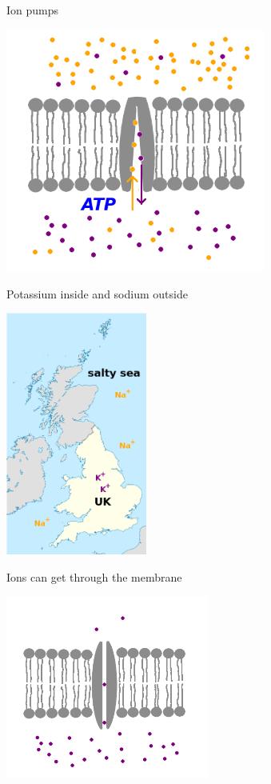 \documentclass{beamer}
\begin{document}
\begin{frame}{Ion pumps}
  \begin{center}
    \includegraphics[height=8cm]{ion_pump_2.png}
  \end{center}
\end{frame}


\begin{frame}{Potassium inside and sodium outside}
  \begin{center}
    \includegraphics[height=8cm]{uk.png}
  \end{center}
\end{frame}

\begin{frame}{Ions can get through the membrane}
  \begin{center}
    \includegraphics[height=6cm]{passive_channel.png}
  \end{center}
\end{frame}
\end{document}

